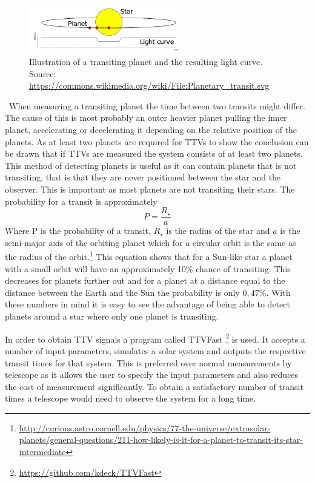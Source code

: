 \documentclass[titlepage]{article}
\begin{document}
	\begin{figure}[h!]
		\centering
		\captionsetup{justification=centering}
		\includegraphics[width=0.6\textwidth]{planTrans.png}
		\caption{Illustration of a transiting planet and the resulting light curve. \\  \small{ Source: \url{https://commons.wikimedia.org/wiki/File:Planetary_transit.svg}}}
		\label{fig:trans}
	\end{figure}\
	When measuring a transiting planet the time between two transits might differ. The cause of this is most probably an outer heavier planet pulling the inner planet, accelerating or decelerating it depending on the relative position of the planets. As at least two planets are required for TTVs to show the conclusion can be drawn that if TTVs are measured the system consists of at least two planets. This method of detecting planets is useful as it can contain planets that is not transiting, that is that they are never positioned between the star and the observer. This is important as most planets are not transiting their stars. The probability for a transit is approximately 
	\begin{equation}
		P = \frac{R_{\star}}{a}
	\end{equation}
	Where P is the probability of a transit, $R_{\star}$ is the radius of the star and $a$ is the semi-major axis of the orbiting planet which for a circular orbit is the same as the radius of the orbit.\footnote{\url{http://curious.astro.cornell.edu/physics/77-the-universe/extrasolar-planets/general-questions/211-how-likely-is-it-for-a-planet-to-transit-its-star-intermediate}} This equation shows that for a Sun-like star a planet with a small orbit will have an approximately 10$\%$ chance of transiting. This decreases for planets further out and for a planet at a distance equal to the distance between the Earth and the Sun the probability is only $0,47\%$. With these numbers in mind it is easy to see the advantage of being able to detect planets around a star where only one planet is transiting.
	
	In order to obtain TTV signals a program called TTVFast \footnote{\url{https://github.com/kdeck/TTVFast}} is used. It accepts a number of input parameters, simulates a solar system and outputs the respective transit times for that system. This is preferred over normal measurements by telescope as it allows the user to specify the input parameters and also reduces the cost of measurement significantly. To obtain a satisfactory number of transit times a telescope would need to observe the system for a long time.
	
\end{document}
